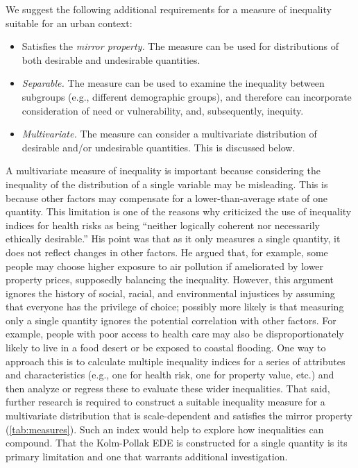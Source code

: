 \documentclass[final,3p,times,onecolumn,sort&compress]{elsarticle}
\begin{document}
We suggest the following additional requirements for a measure of inequality suitable for an urban context:
\begin{itemize}
    \item Satisfies the \textit{mirror property.} The measure can be used for distributions of both desirable and undesirable quantities. 
    \item \textit{Separable.} The measure can be used to examine the inequality between subgroups (e.g., different demographic groups), and therefore can incorporate consideration of need or vulnerability, and, subsequently, inequity.
    \item \textit{Multivariate.} The measure can consider a multivariate distribution of desirable and/or undesirable quantities. This is discussed below.
\end{itemize}

A multivariate measure of inequality is important because considering the inequality of the distribution of a single variable may be misleading.
This is because other factors may compensate for a lower-than-average state of one quantity.
This limitation is one of the reasons why \cite{Cox2012-lg} criticized the use of inequality indices for health risks as being ``neither logically coherent nor necessarily ethically desirable.''
His point was that as it only measures a single quantity, it does not reflect changes in other factors. 
He argued that, for example, some people may choose higher exposure to air pollution if ameliorated by lower property prices, supposedly balancing the inequality. 
However, this argument ignores the history of social, racial, and environmental injustices by assuming that everyone has the privilege of choice;
possibly more likely is that measuring only a single quantity ignores the potential correlation with other factors.
For example, people with poor access to health care may also be disproportionately likely to live in a food desert or be exposed to coastal flooding.
One way to approach this is to calculate multiple inequality indices for a series of attributes and characteristics (e.g., one for health risk, one for property value, etc.) and then analyze or regress these to evaluate these wider inequalities.
That said, further research is required to construct a suitable inequality measure for a multivariate distribution that is scale-dependent and satisfies the mirror property (\autoref{tab:measures}).
Such an index would help to explore how inequalities can compound.
That the Kolm-Pollak EDE is constructed for a single quantity is its primary limitation and one that warrants additional investigation.
\end{document}
